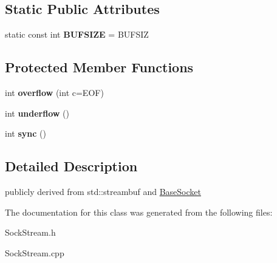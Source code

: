 \subsection*{Static Public Attributes}
\begin{CompactItemize}
\item 
\hypertarget{classsocketpp_1_1SockBuf_2b90c5705f30dd3fda03a6eb13378e15}{
static const int \textbf{BUFSIZE} = BUFSIZ}
\label{classsocketpp_1_1SockBuf_2b90c5705f30dd3fda03a6eb13378e15}

\end{CompactItemize}
\subsection*{Protected Member Functions}
\begin{CompactItemize}
\item 
\hypertarget{classsocketpp_1_1SockBuf_5a1f6d2304fe83a8602e07d12032b2c7}{
int \textbf{overflow} (int c=EOF)}
\label{classsocketpp_1_1SockBuf_5a1f6d2304fe83a8602e07d12032b2c7}

\item 
\hypertarget{classsocketpp_1_1SockBuf_34ccc364e9f20a25199bea9fdde19bdd}{
int \textbf{underflow} ()}
\label{classsocketpp_1_1SockBuf_34ccc364e9f20a25199bea9fdde19bdd}

\item 
\hypertarget{classsocketpp_1_1SockBuf_33c3d2907102b5b38daca32fb2c12591}{
int \textbf{sync} ()}
\label{classsocketpp_1_1SockBuf_33c3d2907102b5b38daca32fb2c12591}

\end{CompactItemize}


\subsection{Detailed Description}
publicly derived from std::streambuf and \hyperlink{classsocketpp_1_1BaseSocket}{BaseSocket} 

The documentation for this class was generated from the following files:\begin{CompactItemize}
\item 
SockStream.h\item 
SockStream.cpp\end{CompactItemize}
